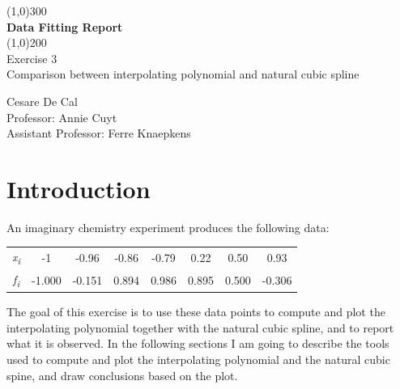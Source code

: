 \documentclass{article}
\begin{document}
\begin{titlepage}
	\begin{center}
	\line(1,0){300}\\
	[0.25in]
	\huge{\bfseries Data Fitting Report}  \\
	[2mm]
	\line(1,0){200} \\
	[1.5cm]
	\Large{Exercise 3} \\
	[0.25cm]
	\Large{Comparison between interpolating polynomial and natural cubic spline} \\
	[12cm]
	\end{center}
	\begin{flushright}
	\large{Cesare De Cal \\
	[0.25cm]
	Professor: Annie Cuyt \\
	[0.25cm]
	Assistant Professor: Ferre Knaepkens \\
	}
	\end{flushright}
\end{titlepage}

\section{Introduction}\label{sec:intro}
An imaginary chemistry experiment produces the following data:

  \begin{table}[!ht]
    \large        %
    \centering    %
    \begin{tabular}{|c|c|c|c|c|c|c|c|}
    \hline
    \it{x}\textsubscript{i}&-1&-0.96&-0.86&-0.79&0.22&0.50&0.93\\     %
    \it{f}\textsubscript{i}&-1.000&-0.151&0.894&0.986&0.895&0.500&-0.306\\
    \hline        %
    \end{tabular}
  \end{table}

The goal of this exercise is to use these data points to compute and plot the interpolating polynomial together with the natural cubic spline, and to report what it is observed. In the following sections I am going to describe the tools used to compute and plot the interpolating polynomial and the natural cubic spine, and draw conclusions based on the plot.
\end{document}
